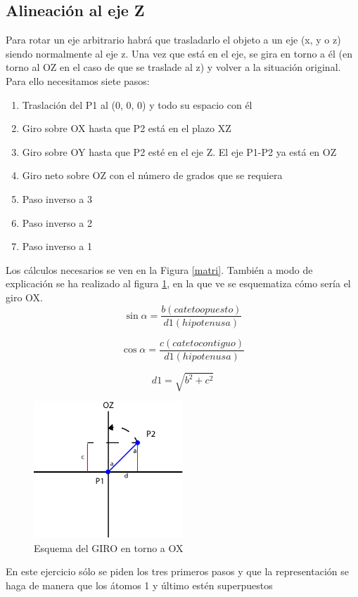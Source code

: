 \documentclass[a4paper,11pt]{report}
\begin{document}
 
 \subsection{Alineación al eje Z}
Para rotar un eje arbitrario habrá que trasladarlo el objeto a un eje (x, y o z) siendo normalmente al eje z. Una vez que está en el eje, se gira en torno a él (en torno al OZ en el caso de que se traslade al z) y volver a la situación original. Para ello necesitamos siete pasos:

\begin{enumerate}
	\item Traslación del P1 al (0, 0, 0) y todo su espacio con él
	\item Giro sobre OX hasta que P2 está en el plazo XZ
	\item Giro sobre OY hasta que P2 esté en el eje Z. El eje P1-P2 ya está en OZ
	\item Giro neto sobre OZ con el número de grados que se requiera
	\item Paso inverso a 3
	\item Paso inverso a 2
	\item Paso inverso a 1
\end{enumerate}
Los cálculos necesarios se ven en la Figura \ref{matri}. También a modo de explicación se ha realizado al figura \ref{GiroOX}, en la que ve se esquematiza cómo sería el giro OX.
 \begin{equation}
 	\sin \alpha = \frac{b (cateto opuesto)}{d1 (hipotenusa)}
 \end{equation}

 \begin{equation}
	\cos\alpha = \frac{c (cateto contiguo)}{d1 (hipotenusa)}
\end{equation}

\begin{equation}
	d1 = \sqrt{b^2 + c^2} 
\end{equation}

 \begin{figure}[h]
	\centering
	\includegraphics[width=0.5\textwidth]{Figuras/Figura36}
	\caption{Esquema del GIRO en torno a OX}
	\label{GiroOX}
\end{figure}
En este ejercicio sólo se piden los tres primeros pasos y que la representación se haga de manera que los átomos 1 y último estén superpuestos
\end{document}
